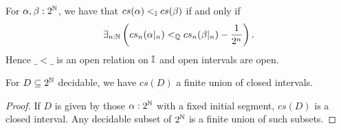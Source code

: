 %
%
%
\begin{remark}
  For $\alpha,\beta:2^{\mathbb{N}}$, we have that $cs(\alpha)<_{\mathbb{I}} cs(\beta)$ if and only if 
  $$\exists_{n:\mathbb{N}}\left(cs_n(\alpha|_n) <_\mathbb Q cs_n(\beta|_n) -\frac{1}{2^n}\right).$$
  Hence $\_<\_$ is an open relation on $\mathbb{I}$ and open intervals are open. 
\end{remark}
%
\begin{lemma}\label{ImageDecidableClosedInterval}
  For $D\subseteq 2^{\mathbb{N}}$ decidable, we have $cs(D)$ a finite union of closed intervals. 
\end{lemma}
\begin{proof}
  If $D$ is given by those $\alpha:2^{\mathbb{N}}$ with a fixed initial segment, $cs(D)$ is a closed interval. 
  Any decidable subset of $2^{\mathbb{N}}$ is a finite union of such subsets. 
\end{proof}
